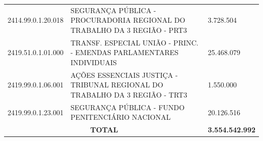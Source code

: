 \documentclass{article}
\begin{document}
\begin{longtable}[c]{m{2cm}|m{13cm}|m{2cm}}
\multicolumn{1}{C{2cm}|}{2414.99.0.1.20.018} & \multicolumn{1}{L{13cm}|}{SEGURANÇA PÚBLICA - PROCURADORIA REGIONAL DO TRABALHO DA 3 REGIÃO - PRT3} & \multicolumn{1}{R{2cm}}{3.728.504} \\
\multicolumn{1}{C{2cm}|}{2419.51.0.1.01.000} & \multicolumn{1}{L{13cm}|}{TRANSF. ESPECIAL UNIÃO - PRINC. - EMENDAS PARLAMENTARES INDIVIDUAIS} & \multicolumn{1}{R{2cm}}{25.468.079} \\
\multicolumn{1}{C{2cm}|}{2419.99.0.1.06.001} & \multicolumn{1}{L{13cm}|}{AÇÕES ESSENCIAIS JUSTIÇA - TRIBUNAL REGIONAL DO TRABALHO DA 3 REGIÃO - TRT3} & \multicolumn{1}{R{2cm}}{1.550.000} \\
\multicolumn{1}{C{2cm}|}{2419.99.0.1.23.001} & \multicolumn{1}{L{13cm}|}{SEGURANÇA PÚBLICA - FUNDO PENITENCIÁRIO NACIONAL} & \multicolumn{1}{R{2cm}}{20.126.516} \\
\hline
\multicolumn{2}{c|}{ \textbf{TOTAL}} & \multicolumn{1}{R{2cm}}{ \textbf{3.554.542.992}} \\\hline\hline\end{longtable}\raggedright\fontsize{7pt}{10pt}\selectfont {Fonte: PPO.} \\\fontsize{7pt}{10pt}\selectfont {ELABORAÇÃO: DCAF/SCPPO/SEPLAG}\\\fontsize{7pt}{10pt}\selectfont {Nota: Na elaboração desse relatório foram consideradas as fontes de recurso 1, 2, 3, 4, 5, 6, 7, 8, 16, 17, 21, 24, 36, 37, 38, 56, 57, 62, 63, 64, 65, 73, 92, 93, 97 e 98.}\\
\end{document}
